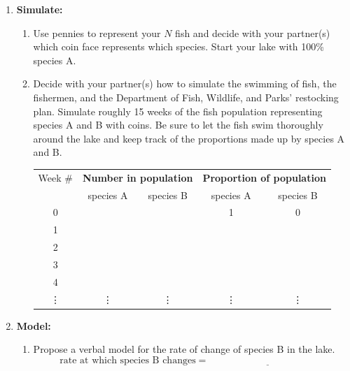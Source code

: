 \begin{lab}
\begin{enumerate}
    \item {\bf Simulate:}
        \begin{enumerate}
            \item Use pennies to represent your $N$ fish and decide with your partner(s) which
                coin face represents which species. Start your lake with 100\% species A.
            \item Decide with your partner(s) how to simulate the swimming of fish, the fishermen,
                and the Department of Fish, Wildlife, and Parks' restocking plan.  Simulate
                roughly 15 weeks of the fish population representing species A and B with coins.
                Be sure to let the fish swim thoroughly around the lake and keep track of the
                proportions made up by species A and B.
                \begin{center}
                    \begin{tabular}{|c||c|c||c|c|}
                        \hline
                        Week \# & \multicolumn{2}{|c||}{{\bf Number in population}} & \multicolumn{2}{|c|}{{\bf Proportion of population}}\\
                        & species A & species B & species A & species B \\
                        \hline
                        0 &  &  & 1 & 0 \\ \hline
                        1 & & & & \\ \hline
                        2 & & & & \\ \hline
                        3 & & & & \\ \hline
                        4 & & & & \\ \hline
                        \vdots & \vdots & \vdots & \vdots & \vdots \\ \hline
                    \end{tabular}
                \end{center}
        \end{enumerate}

    \item {\bf Model:} 
        \begin{enumerate}
            \item Propose a verbal model for the rate of change of species B in the lake.
                \[ \text{rate at which species B changes} = \underline{\hspace{2in}} \]


\end{enumerate}
\end{enumerate}
\end{lab}

